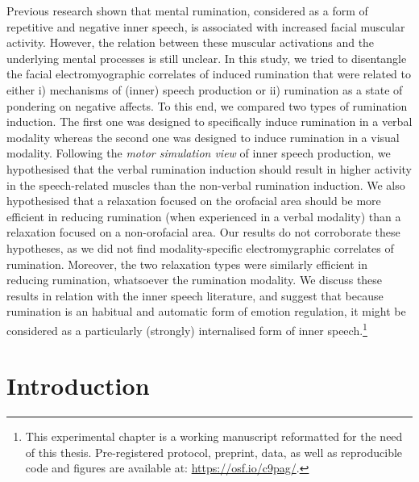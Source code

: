 \documentclass[a4paper,12pt,twoside,openright,oldfontcommands,final]{memoir}
\let\rmarkdownfootnote\footnote%
\def\footnote{\protect\rmarkdownfootnote}
\newcommand{\initial}[1]{
	\lettrine[lines=3,lhang=0.33,nindent=0em]{
		\color{gray}
     		{\textsc{#1}}}{}}
\begin{document}
\initial{P}revious research shown that mental rumination, considered as a form of repetitive and negative inner speech, is associated with increased facial muscular activity. However, the relation between these muscular activations and the underlying mental processes is still unclear. In this study, we tried to disentangle the facial electromyographic correlates of induced rumination that were related to either i) mechanisms of (inner) speech production or ii) rumination as a state of pondering on negative affects. To this end, we compared two types of rumination induction. The first one was designed to specifically induce rumination in a verbal modality whereas the second one was designed to induce rumination in a visual modality. Following the \emph{motor simulation view} of inner speech production, we hypothesised that the verbal rumination induction should result in higher activity in the speech-related muscles than the non-verbal rumination induction. We also hypothesised that a relaxation focused on the orofacial area should be more efficient in reducing rumination (when experienced in a verbal modality) than a relaxation focused on a non-orofacial area. Our results do not corroborate these hypotheses, as we did not find modality-specific electromygraphic correlates of rumination. Moreover, the two relaxation types were similarly efficient in reducing rumination, whatsoever the rumination modality. We discuss these results in relation with the inner speech literature, and suggest that because rumination is an habitual and automatic form of emotion regulation, it might be considered as a particularly (strongly) internalised form of inner speech.\footnote{This experimental chapter is a working manuscript reformatted for the need of this thesis. Pre-registered protocol, preprint, data, as well as reproducible code and figures are available at: \url{https://osf.io/c9pag/}.}

\hypertarget{introduction-1}{%
\section{Introduction}\label{introduction-1}}
\end{document}
